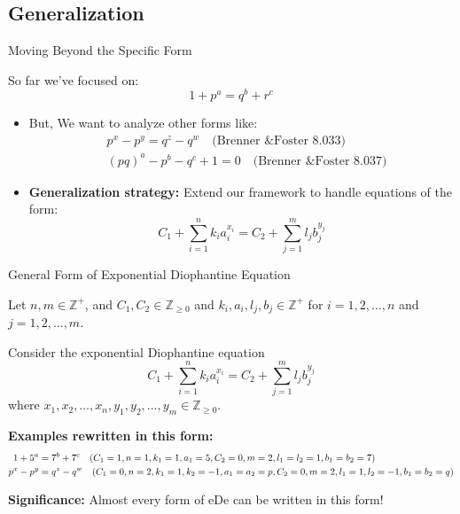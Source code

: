 \subsection{Generalization}
\begin{frame}{Moving Beyond the Specific Form}
    \begin{block}{So far we've focused on:}
        \[1+p^a = q^b + r^c\]
    \end{block}
    
    \begin{itemize}
        \item But, We want to analyze other forms like:
        \begin{align*}
            &p^x - p^y = q^z - q^w \quad \text{(Brenner \& Foster 8.033)}\\
            &(pq)^a - p^b - q^c + 1 = 0 \quad \text{(Brenner \& Foster 8.037)}
        \end{align*}
        
        
        \item \textbf{Generalization strategy:} Extend our framework to handle equations of the form:
        \[C_1 + \sum_{i=1}^n k_i a_i^{x_i} = C_2 + \sum_{j=1}^m l_j b_j^{y_j}\]
    \end{itemize}
\end{frame}

\begin{frame}{General Form of Exponential Diophantine Equation}
    \begin{definition}
        Let $n,m \in \mathbb{Z}^{+}$, and $C_1, C_2 \in \mathbb{Z}_{\geq 0}$ and $k_i, a_i, l_j, b_j \in \mathbb{Z}^{+}$ for $i=1,2,\dots,n$ and $j=1,2,\dots,m$. 
        
        Consider the exponential Diophantine equation
        \begin{equation}
            C_1 + \sum_{i=1}^n k_i a_i^{x_i} = C_2 + \sum_{j=1}^m l_j b_j^{y_j} \label{general}
        \end{equation}
        where $x_1,x_2,\dots,x_n, y_1,y_2,\dots,y_m \in \mathbb{Z}_{\geq 0}$.
    \end{definition}
    
    \textbf{Examples rewritten in this form:}
    \begin{align*}
        1 + 5^a &= 7^b + 7^c \quad \small(C_1=1, n=1, k_1=1, a_1=5, C_2=0, m=2, l_1=l_2=1, b_1=b_2=7)\\
        p^x - p^y &= q^z - q^w \quad (C_1=0, n=2, k_1=1, k_2=-1, a_1=a_2=p, C_2=0, m=2, l_1=1, l_2=-1, b_1=b_2=q)
    \end{align*}
    
    \textbf{Significance:} Almost every form of eDe can be written in this form!
\end{frame}

